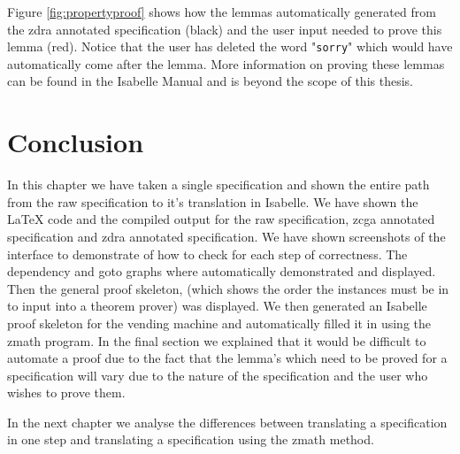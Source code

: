 Figure \ref{fig:propertyproof} shows how the lemmas automatically generated from
the \gls{zdra} annotated specification (black) and the user input needed to
prove this lemma (red). Notice that the user has deleted the word
"\texttt{sorry}" which would have automatically come after the lemma. More
information on proving these lemmas can be found in the Isabelle Manual
\cite{isabelle} and is beyond the scope of this thesis.

\section{Conclusion}
In this chapter we have taken a single specification and shown the entire path
from the raw specification to it's translation in Isabelle. We have shown the
\LaTeX{} code and the compiled output for the raw specification, \gls{zcga}
annotated specification and \gls{zdra} annotated specification. We have shown
screenshots of the interface to demonstrate of how to check for each step of
correctness. The dependency and goto graphs where automatically demonstrated and
displayed. Then the general proof skeleton, (which shows the order the instances
must be in to input into a theorem prover) was displayed. We then generated an
Isabelle proof skeleton for the vending machine and automatically filled it in
using the \gls{zmath} program. In the final section we explained that it would
be difficult to automate a proof due to the fact that the lemma's which need to
be proved for a specification will vary due to the nature of the specification
and the user who wishes to prove them. 

In the next chapter we analyse the differences between translating a
specification in one step and translating a specification using the \gls{zmath}
method.